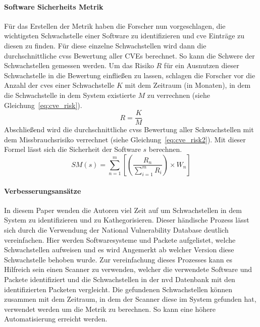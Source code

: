\documentclass[12pt, a4paper, ngerman]{article}
\begin{document}
\paragraph{Software Sicherheits Metrik}

Für das Erstellen der Metrik haben die Forscher nun vorgeschlagen, 
die wichtigsten Schwachstelle einer Software zu identifizieren und \ac{cve} Einträge zu diesen zu finden.
Für diese einzelne Schwachstellen wird dann die durchschnittliche \ac{cvss} Bewertung aller CVEs berechnet.
So kann die Schwere der Schwachstellen gemessen werden.
Um das Risiko \(R\) für ein Ausnutzen dieser Schwachstelle in die Bewertung einfließen zu lassen, 
schlagen die Forscher vor die Anzahl der \ac{cve}s einer Schwachstelle \(K\) mit dem Zeitraum (in Monaten), in dem die Schwachstelle in dem System existierte \(M\) zu verrechnen (siehe Gleichung~\ref{eq:cve_risk}).
\begin{equation} \label{eq:cve_risk}
  R = \frac{ K }{ M }
\end{equation}
Abschließend wird die durchschnittliche \ac{cvss} Bewertung aller Schwachstellen mit dem Missbrauchsrisiko verrechnet (siehe Gleichung~\ref{eq:cve_risk2}).
Mit dieser Formel lässt sich die Sicherheit der Software \(s\) berechnen.
\begin{equation} \label{eq:cve_risk2}
  SM \left( s \right) = \sum_{ n=1 }^{ m }{ \left[ \left( \frac{ R_{ n } }{ \sum_{ i=1 }^{ m }{ R_{ i } } } \right) \times W_{ n } \right] }
\end{equation}

\paragraph{Verbesserungsansätze}
In diesem Paper wenden die Autoren viel Zeit auf um Schwachstellen in dem System zu identifizieren und zu Kathegorisieren.
Dieser händische Prozess lässt sich durch die Verwendung der National Vulnerability Database deutlich vereinfachen.
Hier werden Softwaresysteme und Packete aufgelistet, welche Schwachstellen aufweisen und 
es wird Angemerkt ab welcher Version diese Schwachstelle behoben wurde.
Zur vereinfachung dieses Prozesses kann es Hilfreich sein einen Scanner zu verwenden, 
welcher die verwendete Software und Packete identifiziert und 
die Schwachstellen in der \ac{nvd} Datenbank mit den identifizierten Packeten vergleicht.
Die gefundenen Schwachstellen können zusammen mit dem Zeitraum, 
in dem der Scanner diese im System gefunden hat, verwendet werden um die Metrik zu berechnen.
So kann eine höhere Automatisierung erreicht werden.
\end{document}
